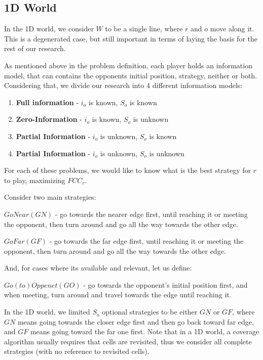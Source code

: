 \documentclass[a4paper,english,10pt]{article}
\newcommand\rob{\ensuremath{r}\xspace}
\newcommand\opp{\ensuremath{o}\xspace}
\newcommand{\w}{\ensuremath{W}\xspace}
\newcommand{\fcc}{\ensuremath{FCC}\xspace}
\newcommand{\gn}{\ensuremath{GN}\xspace}
\newcommand{\gf}{\ensuremath{GF}\xspace}
\newcommand{\go}{\ensuremath{GO}\xspace}
\begin{document}
\subsection{1D World} \label{sections:1D intro}
In the 1D world, we consider \w to be a single line, where \rob and \opp move along it. This is a degenerated case, but still important in terms of laying the basis for the rest of our research.

As mentioned above in the problem definition, each player holds an information model, that can contains the opponents initial position, strategy, neither or both. Considering that, we divide our research into 4 different information models:
\begin{enumerate}
\item \textbf{Full information} - $i_\opp$ is known, $S_\opp$ is known
\item \textbf{Zero-Information} - $i_\opp$ is known, $S_\opp$ is unknown
\item \textbf{Partial Information} -  $i_\opp$ is unknown, $S_\opp$ is known
\item \textbf{Partial Information} - $i_\opp$ is unknown, $S_\opp$ is unknown
\end{enumerate}

For each of these problems, we would like to know what is the best strategy for \rob to play, maximizing $\fcc_\rob$.

Consider two main strategies:

$GoNear(\gn)$ - go towards the nearer edge first, until reaching it or meeting the opponent, then turn around and go all the way towards the other edge.

$GoFar(\gf)$ - go towards the far edge first, until reaching it or meeting the opponent, then turn around and go all the way towards the other edge.

And, for cases where its available and relevant, let us define:

$Go(to)Oppenet(\go)$ - go towards the opponent's initial position first, and when meeting, turn around and travel towards the edge until reaching it.

In the 1D world, we limited $S_\opp$ optional strategies to be either \gn or \gf, where \gn means going towards the closer edge first and then go back toward far edge, and \gf means going toward the far one first. 
Note that in a 1D world, a coverage algorithm usually requires that cells are revisited, thus we consider all complete strategies (with no reference to revisited cells).
\end{document}
